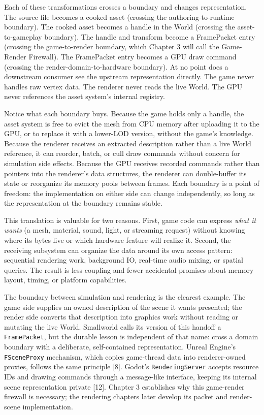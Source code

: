 \documentclass[
  11pt,
  letterpaper,
  DIV=11,
  numbers=noendperiod,
  twoside,
  open=right]{scrreprt}
\begin{document}
Each of these transformations crosses a boundary and changes
representation. The source file becomes a cooked asset (crossing the
authoring-to-runtime boundary). The cooked asset becomes a handle in the
World (crossing the asset-to-gameplay boundary). The handle and
transform become a FramePacket entry (crossing the game-to-render
boundary, which Chapter 3 will call the Game-Render Firewall). The
FramePacket entry becomes a GPU draw command (crossing the
render-domain-to-hardware boundary). At no point does a downstream
consumer see the upstream representation directly. The game never
handles raw vertex data. The renderer never reads the live World. The
GPU never references the asset system's internal registry.

Notice what each boundary buys. Because the game holds only a handle,
the asset system is free to evict the mesh from CPU memory after
uploading it to the GPU, or to replace it with a lower-LOD version,
without the game's knowledge. Because the renderer receives an extracted
description rather than a live World reference, it can reorder, batch,
or cull draw commands without concern for simulation side effects.
Because the GPU receives recorded commands rather than pointers into the
renderer's data structures, the renderer can double-buffer its state or
reorganize its memory pools between frames. Each boundary is a point of
freedom: the implementation on either side can change independently, so
long as the representation at the boundary remains stable.

This translation is valuable for two reasons. First, game code can
express \emph{what it wants} (a mesh, material, sound, light, or
streaming request) without knowing where its bytes live or which
hardware feature will realize it. Second, the receiving subsystem can
organize the data around its own access pattern: sequential rendering
work, background IO, real-time audio mixing, or spatial queries. The
result is less coupling and fewer accidental promises about memory
layout, timing, or platform capabilities.

The boundary between simulation and rendering is the clearest example.
The game side supplies an owned description of the scene it wants
presented; the render side converts that description into graphics work
without reading or mutating the live World. Smallworld calls its version
of this handoff a \texttt{FramePacket}, but the durable lesson is
independent of that name: cross a domain boundary with a deliberate,
self-contained representation. Unreal Engine's \texttt{FSceneProxy}
mechanism, which copies game-thread data into renderer-owned proxies,
follows the same principle {[}8{]}. Godot's \texttt{RenderingServer}
accepts resource IDs and drawing commands through a message-like
interface, keeping its internal scene representation private {[}12{]}.
Chapter 3 establishes why this game-render firewall is necessary; the
rendering chapters later develop its packet and render-scene
implementation.
\end{document}
